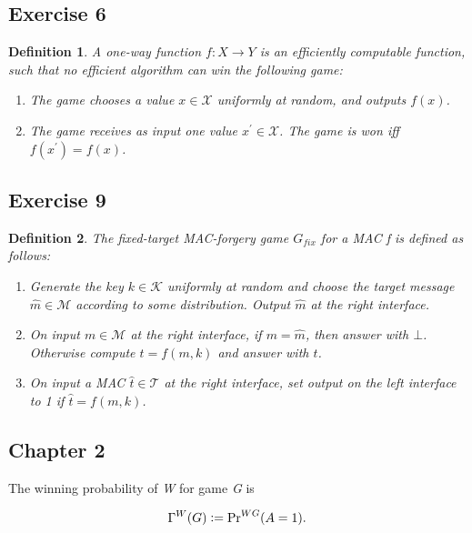 \documentclass[a4paper,german]{article}
\newtheorem{definition}{Definition}
\newenvironment{customdef}[1]{\renewcommand\theinnercustomdef{#1}\innercustomdef}{\endinnercustomdef}
\begin{document}
\subsection*{Exercise 6}
\begin{definition}
	A one-way function $f: X \rightarrow Y$ is an efficiently computable function, such that no efficient algorithm can win the following game:

	\begin{enumerate}

		\item  The game chooses a value $x \in \mathcal{X}$ uniformly at random, and outputs $f(x)$.
		\item  The game receives as input one value $x^\prime \in \mathcal{X}$. The game is won iff $f(x^\prime) = f(x)$.

	\end{enumerate}
\end{definition}

\subsection*{Exercise 9}
\begin{definition}
  The fixed-target MAC-forgery game $G_{fix}$ for a MAC f is defined as follows:

	\begin{enumerate}

		\item  Generate the key $k \in \mathcal{K}$ uniformly at random and choose the target message $\hat{m} \in \mathcal{M}$ according to some distribution. Output $\hat{m}$ at the right interface.
		\item  On input $m \in \mathcal{M}$ at the right interface, if $m = \hat{m}$, then answer with $\bot$. Otherwise compute $t=f(m,k)$ and answer with $t$.
		\item  On input a MAC $\hat{t} \in \mathcal{T}$ at the right interface, set output on the left interface to 1 if $\hat{t}=f(m,k)$.

	\end{enumerate}
\end{definition}

\subsection*{Chapter 2}

\begin{customdef}{2.1}
	The winning probability of \emph{W} for game \emph{G} is

	\[
		\Gamma^{W}(G) \vcentcolon= \Pr\nolimits^{WG}(A = 1)
	.\]

\end{customdef}
\end{document}
